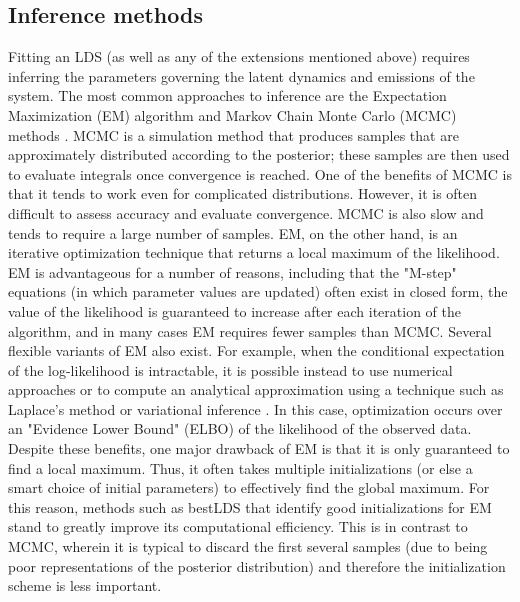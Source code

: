 \subsection{Inference methods}
\label{sec:bestlds:background:inference}

Fitting an LDS (as well as any of the extensions mentioned above) requires inferring the parameters governing the latent dynamics and emissions of the system. The most common approaches to inference are the Expectation Maximization (EM) algorithm \cite{baum_maximization_1970, dempster_maximum_1977, shumway_approach_1982, escola_hidden_2011} and Markov Chain Monte Carlo (MCMC)  methods \cite{metropolis_equation_1953, hastings_monte_1970, geman_stochastic_1984, gelfand_sampling-based_1990}. MCMC is a simulation method that produces samples that are approximately distributed according to the posterior; these samples are then used to evaluate integrals once convergence is reached. One of the benefits of MCMC is that it tends to work even for complicated distributions. However, it is often difficult to assess accuracy and evaluate convergence. MCMC is also slow and tends to require a large number of samples. EM, on the other hand, is an iterative optimization technique that returns a local maximum of the likelihood. EM is advantageous for a number of reasons, including that the "M-step" equations (in which parameter values are updated) often exist in closed form, the value of the likelihood is guaranteed to increase after each iteration of the algorithm, and in many cases EM requires fewer samples than MCMC. Several flexible variants of EM also exist. For example, when the conditional expectation of the log-likelihood is intractable, it is possible instead to use numerical approaches or to compute an analytical approximation using a technique such as Laplace's method \cite{steele_modified_1996} or variational inference \cite{blei_variational_2017}. In this case, optimization occurs over an "Evidence Lower Bound" (ELBO) of the likelihood of the observed data. Despite these benefits, one major drawback of EM is that it is only guaranteed to find a local maximum. Thus, it often takes multiple initializations (or else a smart choice of initial parameters) to effectively find the global maximum. For this reason, methods such as bestLDS that identify good initializations for EM stand to greatly improve its computational efficiency. This is in contrast to MCMC, wherein it is typical to discard the first several samples (due to being poor representations of the posterior distribution) and therefore the initialization scheme is less important.